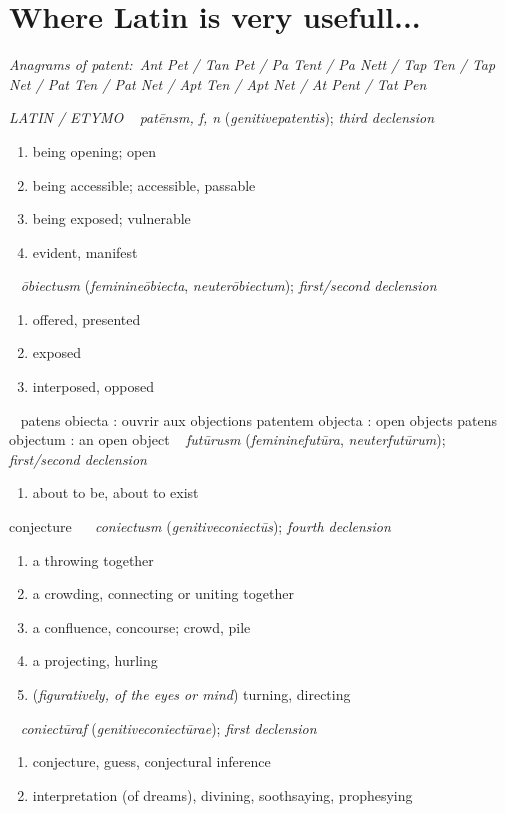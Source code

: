 \section{Where Latin is very usefull...}
\textit{Anagrams of patent:~Ant Pet / Tan Pet / Pa Tent / Pa
Nett / Tap Ten / Tap Net / Pat Ten / Pat Net / Apt Ten / Apt Net / At
Pent / Tat Pen}

\textit{LATIN / ETYMO}
~
\textit{pat\=ens}\textit{m, f, n}
(\textit{genitive}\textit{patentis});
\textit{third declension}

\begin{enumerate}
\item being opening; open 
\item being accessible; accessible, passable 
\item being exposed; vulnerable 
\item evident, manifest 
\end{enumerate}
~
\textit{\=obiectus}\textit{m}
(\textit{feminine}\textit{\=obiecta},
\textit{neuter}\textit{\=obiectum});
\textit{first/second declension}

\begin{enumerate}
\item offered, presented 
\item exposed 
\item interposed, opposed 
\end{enumerate}
~
patens obiecta : ouvrir aux objections
patentem objecta : open objects
patens objectum : an open object
~
\textit{fut\=urus}\textit{m}
(\textit{feminine}\textit{fut\=ura},
\textit{neuter}\textit{fut\=urum});
\textit{first/second declension}

\begin{enumerate}
\item about to be, about to exist 
\end{enumerate}
conjecture~
~
\textit{coniectus}\textit{m}
(\textit{genitive}\textit{coniect\=us});
\textit{fourth declension}

\begin{enumerate}
\item a throwing together 
\item a crowding, connecting or uniting together 
\item a confluence, concourse; crowd, pile 
\item a projecting, hurling 
\item (\textit{figuratively, of the eyes or mind}) turning,
directing 
\end{enumerate}
~
\textit{coniect\=ura}\textit{f}
(\textit{genitive}\textit{coniect\=urae});
\textit{first declension}

\begin{enumerate}
\item conjecture, guess, conjectural inference 
\item interpretation (of dreams), divining, soothsaying, prophesying 
\end{enumerate}
